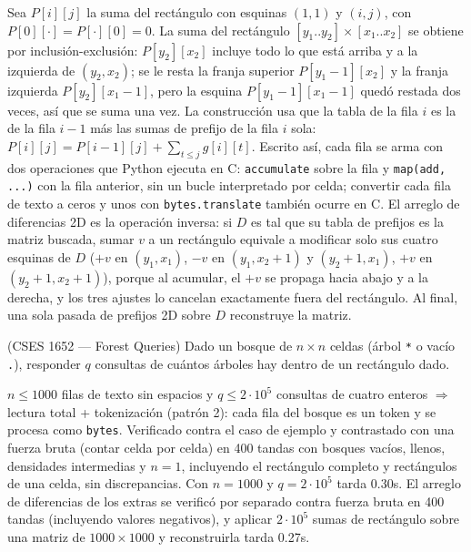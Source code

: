  Sea $P[i][j]$ la suma del rectángulo con esquinas $(1,1)$ y $(i,j)$, con $P[0][\cdot] = P[\cdot][0] = 0$. La suma del rectángulo $[y_1..y_2] \times [x_1..x_2]$ se obtiene por inclusión-exclusión: $P[y_2][x_2]$ incluye todo lo que está arriba y a la izquierda de $(y_2, x_2)$; se le resta la franja superior $P[y_1-1][x_2]$ y la franja izquierda $P[y_2][x_1-1]$, pero la esquina $P[y_1-1][x_1-1]$ quedó restada dos veces, así que se suma una vez. La construcción usa que la tabla de la fila $i$ es la de la fila $i-1$ más las sumas de prefijo de la fila $i$ sola: $P[i][j] = P[i-1][j] + \sum_{t \le j} g[i][t]$. Escrito así, cada fila se arma con dos operaciones que Python ejecuta en C: \texttt{accumulate} sobre la fila y \texttt{map(add, ...)} con la fila anterior, sin un bucle interpretado por celda; convertir cada fila de texto a ceros y unos con \texttt{bytes.translate} también ocurre en C. El arreglo de diferencias 2D es la operación inversa: si $D$ es tal que su tabla de prefijos es la matriz buscada, sumar $v$ a un rectángulo equivale a modificar solo sus cuatro esquinas de $D$ ($+v$ en $(y_1, x_1)$, $-v$ en $(y_1, x_2+1)$ y $(y_2+1, x_1)$, $+v$ en $(y_2+1, x_2+1)$), porque al acumular, el $+v$ se propaga hacia abajo y a la derecha, y los tres ajustes lo cancelan exactamente fuera del rectángulo. Al final, una sola pasada de prefijos 2D sobre $D$ reconstruye la matriz.


(CSES 1652 — Forest Queries) Dado un bosque de $n \times n$ celdas (árbol \texttt{*} o vacío \texttt{.}), responder $q$ consultas de cuántos árboles hay dentro de un rectángulo dado.

 $n \le 1000$ filas de texto sin espacios y $q \le 2\cdot10^5$ consultas de cuatro enteros $\Rightarrow$ lectura total + tokenización (patrón 2): cada fila del bosque es un token y se procesa como \texttt{bytes}. Verificado contra el caso de ejemplo y contrastado con una fuerza bruta (contar celda por celda) en 400 tandas con bosques vacíos, llenos, densidades intermedias y $n = 1$, incluyendo el rectángulo completo y rectángulos de una celda, sin discrepancias. Con $n = 1000$ y $q = 2\cdot10^5$ tarda \aprox{}0.30s. El arreglo de diferencias de los extras se verificó por separado contra fuerza bruta en 400 tandas (incluyendo valores negativos), y aplicar $2\cdot10^5$ sumas de rectángulo sobre una matriz de $1000 \times 1000$ y reconstruirla tarda \aprox{}0.27s.


